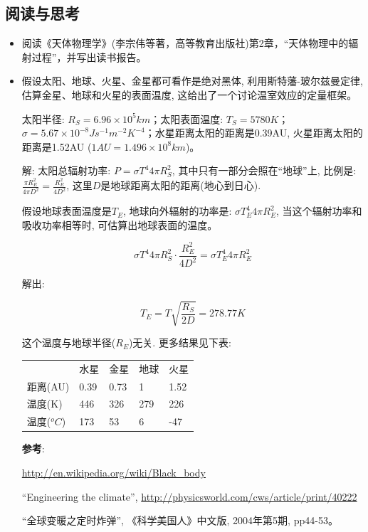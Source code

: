 \subsection*{阅读与思考}

\begin{itemize}
\item 阅读《天体物理学》(李宗伟等著，高等教育出版社)第2章，``天体物理中的辐射过程''，并写出读书报告。

\item
假设太阳、地球、火星、金星都可看作是绝对黑体,
利用斯特藩-玻尔兹曼定律, 估算金星、地球和火星的表面温度,
这给出了一个讨论温室效应的定量框架。

太阳半径: $R_S  = 6.96 \times 10^5 km$；太阳表面温度: $T_S  = 5780K$；$\sigma  = 5.67 \times 10^{ - 8} Js^{ - 1} m^{ - 2} K^{ - 4} $；水星距离太阳的距离是0.39AU, 火星距离太阳的距离是1.52AU ($1AU = 1.496 \times 10^8 km$)。


解: 太阳总辐射功率: $P = \sigma T^4 4 \pi R_S^2$,
其中只有一部分会照在``地球''上, 比例是: $\frac{\pi R_E^2}{4 \pi
D^2}= \frac{R_E^2}{4 D^2}$, 这里$D$是地球距离太阳的距离(地心到日心).

假设地球表面温度是$T_E$, 地球向外辐射的功率是: $\sigma T_E^4 4 \pi
R_E^2$, 当这个辐射功率和吸收功率相等时, 可估算出地球表面的温度。

\begin{equation*}
\sigma T^4 4 \pi R_S^2 \cdot \frac{R_E^2}{4 D^2} = \sigma T_E^4 4
\pi R_E^2
\end{equation*}

解出:

\begin{equation*}
T_E = T \sqrt{\frac{R_S}{2D}} = 278.77 K
\end{equation*}

这个温度与地球半径($R_E$)无关. 更多结果见下表:

\begin{center}
\begin{tabular}{|l|l|l|l|l|}
  \hline
  {} & 水星 & 金星 & 地球 & 火星 \\
  距离(AU) & 0.39 & 0.73 & 1 & 1.52 \\
  温度(K) & 446 & 326 & 279 & 226 \\
  温度(${}^oC$) & 173 & 53 & 6 & -47 \\
  \hline
\end{tabular}
\end{center}



\textbf{参考}:

\url{http://en.wikipedia.org/wiki/Black_body}


``Engineering the climate'',
\url{http://physicsworld.com/cws/article/print/40222}



``全球变暖之定时炸弹'', 《科学美国人》中文版, 2004年第5期, pp44-53。


\end{itemize}


